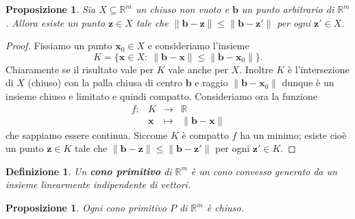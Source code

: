 \documentclass[italian, letter paper, 12pt, reqno]{article}
\theoremstyle{myteo}
\newtheorem{proposition}[theorem]{Proposizione}
\newtheorem{definition}[theorem]{Definizione}
\numberwithin{equation}{section}
\begin{document}
\begin{proposition}
  \label{prop:closed_nearest_point}
  Sia \(X\subseteq \mathbb{R}^m\) un chiuso non vuoto e \(\mathbf{b}\) un punto arbitrario di \(\mathbb{R}^m\).
  Allora esiste un punto \(\mathbf{z}\in X\) tale che \(\|\mathbf{b}-\mathbf{z}\| \le \|\mathbf{b} - \mathbf{z}'\|\) per ogni \(\mathbf{z}'\in X\).
\end{proposition}

\begin{proof}
  Fissiamo un punto \(\mathbf{x}_0\in X\) e consideriamo l'insieme
  \[K=\big\{\mathbf{x}\in X\colon\ \|\mathbf{b} - \mathbf{x}\| \le \|\mathbf{b} - \mathbf{x}_0\|\big\}.\]
  Chiaramente se il risultato vale per \(K\) vale anche per \(X\).
  Inoltre \(K\) è l'intersezione di \(X\) (chiuso) con la palla chiusa di centro \(\mathbf{b}\) e raggio \(\|\mathbf{b} - \mathbf{x}_0\|\) dunque è un insieme chiuso e limitato e quindi compatto.
  Consideriamo ora la funzione
  \begin{equation*}
    \begin{array}{crcl}
      f\colon & K & \to & \mathbb{R}\\
              & \mathbf{x} & \mapsto & \|\mathbf{b} - \mathbf{x}\|
    \end{array}
  \end{equation*}
  che sappiamo essere continua.
  Siccome \(K\) è compatto \(f\) ha un minimo; esiste cioè un punto \(\mathbf{z}\in K\) tale che \(\|\mathbf{b} - \mathbf{z}\| \le \|\mathbf{b} - \mathbf{z}'\|\) per ogni \(\mathbf{z}'\in K\).
\end{proof}

\begin{definition}
  \label{def:cono_primitivo}
  Un \textbf{cono primitivo} di \(\mathbb{R}^m\) è un cono convesso generato da un insieme \emph{linearmente indipendente} di vettori.
\end{definition}

\begin{proposition}
  \label{prop:coni_primitivi_chiusi}
  Ogni cono primitivo \(P\) di \(\mathbb{R}^m\) è chiuso.
\end{proposition}
\end{document}
